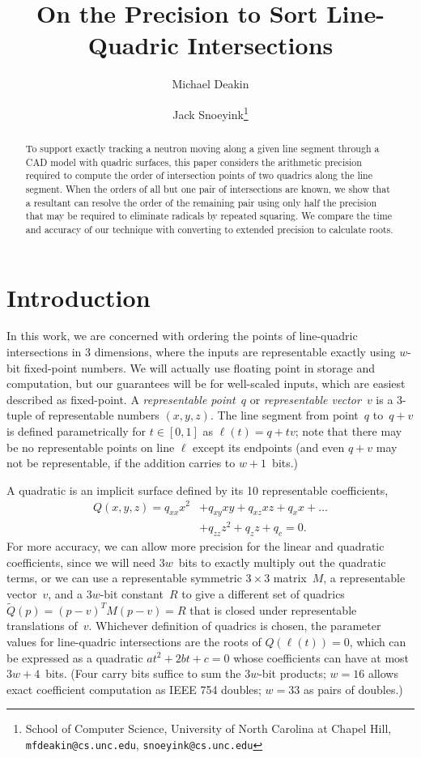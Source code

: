 \documentclass{cccg16}
\title{On the Precision to Sort Line-Quadric Intersections}
\author{Michael Deakin \and Jack Snoeyink\thanks{School of Computer
    Science, University of North Carolina at Chapel Hill, {\tt
      mfdeakin@cs.unc.edu}, {\tt snoeyink@cs.unc.edu}}}
\begin{document}
\thispagestyle{empty}
\maketitle

\begin{abstract}
  To support exactly tracking a neutron moving along a given line
  segment through a CAD model with quadric surfaces, this paper
  considers the arithmetic precision required to compute the order of
  intersection points of two quadrics along the line segment. When the
  orders of all but one pair of intersections are known, we show that a
  resultant can resolve the order of the remaining pair using only
  half the precision that may be required to eliminate radicals by
  repeated squaring. We compare the time and accuracy of our technique
  with converting to extended precision to calculate roots.
\end{abstract}


\section{Introduction}
In this work, we are concerned with ordering the points of
line-quadric intersections in 3 dimensions, where the inputs are
representable exactly using $w$-bit fixed-point numbers.  We will
actually use floating point in storage and computation, but our
guarantees will be for well-scaled inputs, which are easiest described
as fixed-point.  A {\it representable point}~$q$ or {\it representable
  vector}~$v$ is a $3$-tuple of representable numbers $(x, y, z)$. The
line segment from point~$q$ to~$q+v$ is defined parametrically for
$t\in [0,1]$ as $\ell(t)=q+tv$; note that there may be no
representable points on line $\ell$ except its endpoints (and even
$q+v$ may not be representable, if the addition carries to
$w+1$~bits.)

A quadratic is an implicit surface defined by its 10 representable coefficients,
\begin{align*}Q(x, y, z)=q_{xx} x^2 &+ q_{xy} xy + q_{xz} xz + q_x x + \dots \\
&+ q_{zz} z^2 + q_{z} z + q_c = 0.
\end{align*}
For more accuracy, we can allow more precision for the linear and
quadratic coefficients, since we will need $3w$~bits to exactly
multiply out the quadratic terms, or we can use a representable
symmetric $3{\times} 3$ matrix~$M$, a representable vector~$v$, and a
$3w$-bit constant~$R$ to give a different set of quadrics $\tilde Q(p)
= (p-v)^TM(p-v) = R$ that is closed under representable translations
of~$v$. Whichever definition of quadrics is chosen, the parameter
values for line-quadric intersections are the roots of $Q(\ell(t))=0$,
which can be expressed as a quadratic $at^2+2bt+c=0$ whose
coefficients can have at most $3w+4$~bits.  (Four carry bits suffice
to sum the $3w$-bit products; $w=16$ allows exact coefficient
computation as IEEE 754 doubles; $w=33$ as pairs of doubles.)
\end{document}
